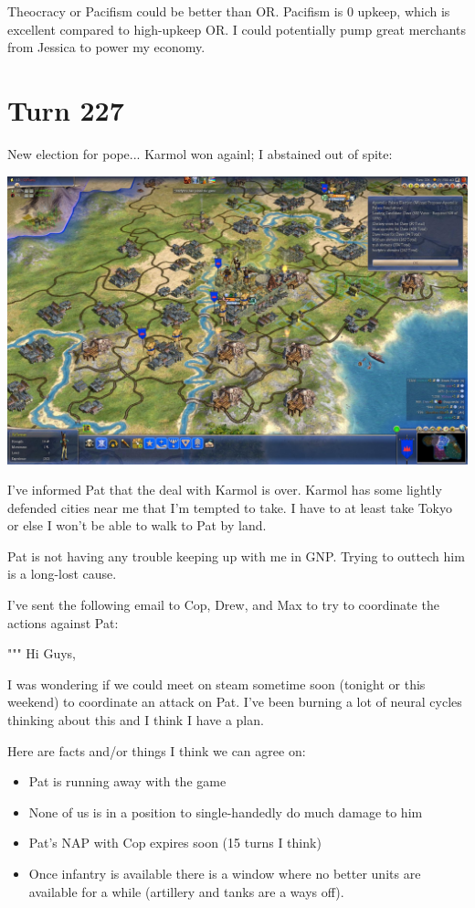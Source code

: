 \documentclass[10pt]{article}
\begin{document}
Theocracy or Pacifism could be better than OR. Pacifism is 0 upkeep,
which is excellent compared to high-upkeep OR. I could potentially
pump great merchants from Jessica to power my economy.

\section*{Turn 227}

New election for pope... Karmol won againl; I abstained out of spite:

\includegraphics[width=1.0\textwidth]{turn226}

I've informed Pat that the deal with Karmol is over. Karmol has some
lightly defended cities near me that I'm tempted to take. I have to at
least take Tokyo or else I won't be able to walk to Pat by land.

Pat is not having any trouble keeping up with me in GNP. Trying to outtech him is a long-lost cause.

I've sent the following email to Cop, Drew, and Max to try to coordinate the actions against Pat:

"""
Hi Guys,

I was wondering if we could meet on steam sometime soon (tonight or this weekend) to coordinate an attack on Pat. I've been burning a lot of neural cycles thinking about this and I think I have a plan.

Here are facts and/or things I think we can agree on:
\begin{itemize}
\item Pat is running away with the game
\item None of us is in a position to single-handedly do much damage to him
\item Pat's NAP with Cop expires soon (15 turns I think)
\item Once infantry is available there is a window where no better units are available for a while (artillery and tanks are a ways off).
\end{itemize}
\end{document}
